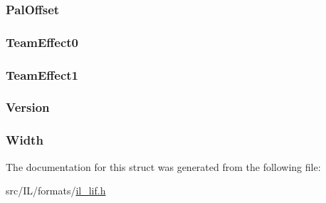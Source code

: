\hypertarget{struct_l_i_f___h_e_a_d_a389d833c38d23cd69719c6deefe9797a}{
\subsubsection[{Pal\-Offset}]{ Pal\-Offset}}\label{struct_l_i_f___h_e_a_d_a389d833c38d23cd69719c6deefe9797a}
\hypertarget{struct_l_i_f___h_e_a_d_a539d8f7bb2feca1f485934ec8d2157aa}{
\subsubsection[{Team\-Effect0}]{ Team\-Effect0}}\label{struct_l_i_f___h_e_a_d_a539d8f7bb2feca1f485934ec8d2157aa}
\hypertarget{struct_l_i_f___h_e_a_d_ae42acacdcc183dd53578e33b34bbbfc6}{
\subsubsection[{Team\-Effect1}]{ Team\-Effect1}}\label{struct_l_i_f___h_e_a_d_ae42acacdcc183dd53578e33b34bbbfc6}
\hypertarget{struct_l_i_f___h_e_a_d_ace8731875025335038f754ff027b835a}{
\subsubsection[{Version}]{ Version}}\label{struct_l_i_f___h_e_a_d_ace8731875025335038f754ff027b835a}
\hypertarget{struct_l_i_f___h_e_a_d_a4146e7b2b0b4097e0e335f9b348392bf}{
\subsubsection[{Width}]{ Width}}\label{struct_l_i_f___h_e_a_d_a4146e7b2b0b4097e0e335f9b348392bf}


The documentation for this struct was generated from the following file\-:\begin{DoxyCompactItemize}
\item 
src/\-I\-L/formats/\hyperlink{il__lif_8h}{il\-\_\-lif.\-h}\end{DoxyCompactItemize}

